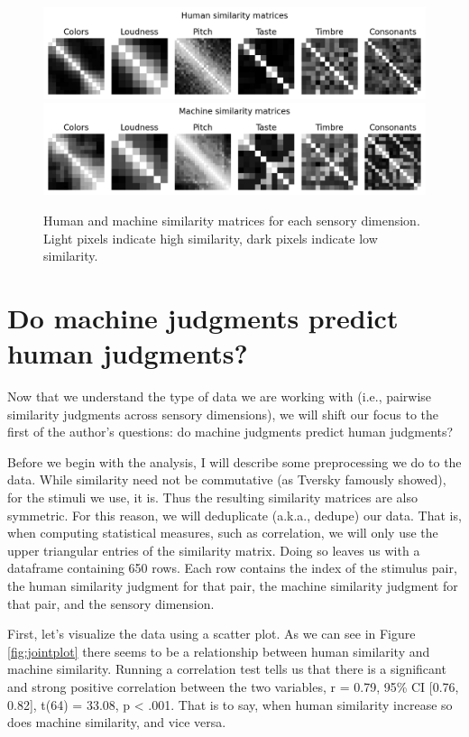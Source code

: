 \documentclass[man]{apa7}
\begin{document}
\begin{figure}
    \centering
    \includegraphics[width=\textwidth]{figures/human_sim.png}
    \includegraphics[width=\textwidth]{figures/mach_sim.png}
    \caption{Human and machine similarity matrices for each sensory dimension. Light pixels indicate high similarity, dark pixels indicate low similarity.}
    \label{fig:sim_matrix}
\end{figure}


\section{Do machine judgments predict human judgments?}

Now that we understand the type of data we are working with (i.e., pairwise similarity judgments across sensory dimensions), we will shift our focus to the first of the author's questions: do machine judgments predict human judgments?

Before we begin with the analysis, I will describe some preprocessing we do to the data. While similarity need not be commutative (as Tversky famously showed), for the stimuli we use, it is. Thus the resulting similarity matrices are also symmetric. For this reason, we will deduplicate (a.k.a., dedupe) our data. That is, when computing statistical measures, such as correlation, we will only use the upper triangular entries of the similarity matrix. Doing so leaves us with a dataframe containing 650 rows. Each row contains the index of the stimulus pair, the human similarity judgment for that pair, the machine similarity judgment for that pair, and the sensory dimension.

First, let's visualize the data using a scatter plot. As we can see in Figure \ref{fig:jointplot} there seems to be a relationship between human similarity and machine similarity. Running a correlation test tells us that there is a significant and strong positive correlation between the two variables, r = 0.79, 95\% CI [0.76, 0.82], t(64) = 33.08, p < .001. That is to say, when human similarity increase so does machine similarity, and vice versa.
\end{document}
